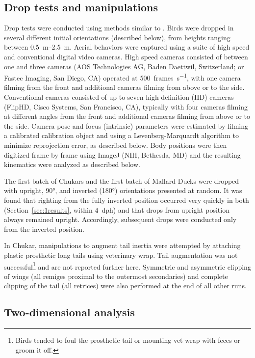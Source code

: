 \subsection{Drop tests and manipulations}

Drop tests were conducted using methods similar to \citep{Jusufi:2008, Munk:2011, Zeng:2011}.  Birds were dropped in several different initial orientations (described below), from heights ranging between \SIrange{0.5}{2.5}{\meter}.  Aerial behaviors were captured using a suite of high speed and conventional digital video cameras.  High speed cameras consisted of between one and three cameras (AOS Technologies AG, Baden Daettwil, Switzerland; or Fastec Imaging, San Diego, CA) operated at \SI{500}{frames\per\second}, with one camera filming from the front and additional cameras filming from above or to the side.  Conventional cameras consisted of up to seven high definition (HD) cameras (FlipHD, Cisco Systems, San Francisco, CA), typically with four cameras filming at different angles from the front and additional cameras filming from above or to the side.  Camera pose and focus (intrinsic) parameters were estimated by filming a calibrated calibration object and using a Levenberg-Marquardt algorithm to minimize reprojection error, as described below.  Body positions were then digitized frame by frame using ImageJ (NIH, Bethesda, MD) and the resulting kinematics were analyzed as described below. 

The first batch of Chukars and the first batch of Mallard Ducks were dropped with upright, \ang{90}, and inverted (\ang{180}) orientations presented at random.  It was found that righting from the fully inverted position occurred very quickly in both (Section~\ref{sec:1results}, within \SI{4}{dph}) and that drops from upright position always remained upright.  Accordingly, subsequent drops were conducted only from the inverted position. 

In Chukar, manipulations to augment tail inertia were attempted by attaching plastic prosthetic long tails using veterinary wrap.  Tail augmentation was not successful\footnote{Birds tended to foul the prosthetic tail or mounting vet wrap with feces or groom it off.} and are not reported further here.  Symmetric and asymmetric clipping of wings (all remiges proximal to the outermost secondaries) and complete clipping of the tail (all retrices) were also performed at the end of all other runs.  

\subsection{Two-dimensional analysis}

